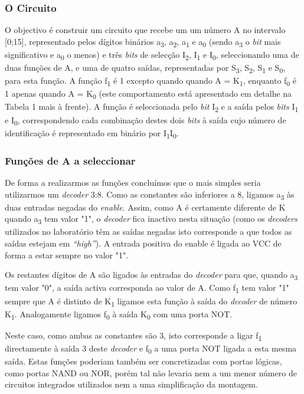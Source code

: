 \documentclass[a4paper,12pt]{article}
\begin{document}
\subsubsection{O Circuito}
O objectivo é construir um circuito que recebe um um número A no intervalo [0;15], representado pelos dígitos binários a\textsubscript{3}, a\textsubscript{2}, a\textsubscript{1} e a\textsubscript{0} (sendo a\textsubscript{3} o {\it bit} mais significativo e a\textsubscript{0} o menos) e três {\it bits} de selecção I\textsubscript{2}, I\textsubscript{1} e I\textsubscript{0}, seleccionando uma de duas funções de A, e uma de quatro saídas, representadas por S\textsubscript{3}, S\textsubscript{2}, S\textsubscript{1} e S\textsubscript{0}, para esta função. A função f\textsubscript{1} é 1 excepto quando quando A = K\textsubscript{1}, enquanto f\textsubscript{0} é 1 apenas quando A = K\textsubscript{0} (este comportamento está apresentado em detalhe na Tabela 1 mais à frente). A função é seleccionada pelo {\it bit} I\textsubscript{2} e a saída pelos {\it bits} I\textsubscript{1} e I\textsubscript{0}, correspondendo cada combinação destes dois {\it bits} à saída cujo número de identificação é representado em binário por I\textsubscript{1}I\textsubscript{0}.
\par
\subsubsection{Funções de A a seleccionar}
De forma a realizarmos as funções concluímos que o mais simples seria utilizarmos um {\it decoder} 3:8. Como as constantes são inferiores a 8, ligamos a\textsubscript{3} às duas entradas negadas do {\it enable}. Assim, como A é certamente diferente de K quando a\textsubscript{3} tem valor "1", o {\it decoder} fica inactivo nesta situação (como os {\it decoders} utilizados no laboratório têm as saídas negadas isto corresponde a que todos as saídas estejam em {\it ``high''}). A entrada positiva do enable é ligada ao VCC de forma a estar sempre no valor "1". 
\par
Os restantes dígitos de A são ligados às entradas do {\it decoder} para que, quando a\textsubscript{3} tem valor "0", a saída activa corresponda ao valor de A. Como f\textsubscript{1} tem valor "1" sempre que A é distinto de K\textsubscript{1} ligamos esta função à saída do {\it decoder} de número K\textsubscript{1}. Analogamente ligamos f\textsubscript{0} à saída K\textsubscript{0} com uma porta NOT.
\par
Neste caso, como ambas as constantes são 3, isto corresponde a ligar f\textsubscript{1} directamente à saída 3 deste {\it decoder} e f\textsubscript{0} a uma porta NOT ligada a esta mesma saída. Estas funções poderiam também ser concretizadas com portas lógicas, como portas NAND ou NOR, porém tal não levaria nem a um menor número de circuitos integrados utilizados nem a uma simplificação da montagem.
\par
\end{document}
